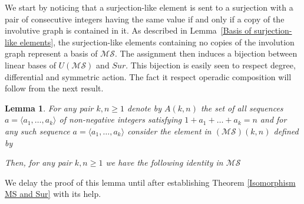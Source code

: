 \documentclass{amsart}
\newcommand{\MS}{\mathcal{MS}}
\newtheorem{lemma}[theorem]{Lemma}
\theoremstyle{definition}
\begin{document}
	We start by noticing that a surjection-like element is sent to a surjection with a pair of consecutive integers having the same value if and only if a copy of the involutive graph is contained in it. As described in \mbox{Lemma \ref{Basis of surjection-like elements}}, the surjection-like elements containing no copies of the involution graph represent a basis of $\MS$. The assignment then induces a bijection between linear bases of $U(\MS)$ and $Sur$. This bijection is easily seen to respect degree, differential and symmetric action. The fact it respect operadic composition will follow from the next result.
	\begin{lemma}\label{splitting lemma}
		For any pair $k,n\geq 1$ denote by $A(k,n)$ the set of all sequences $a=\langle a_1,\dots,a_k\rangle$ of non-negative integers satisfying $1+a_1+\dots+a_k=n$ and for any such sequence $a=\langle a_1,\dots,a_k\rangle$ consider the element in $(\MS)(k,n)$ defined by
		\begin{center}
		\end{center}
		Then, for any pair $k,n\geq1$ we have the following identity in $\MS$
		\begin{center}
		\end{center} 
	\end{lemma}
	We delay the proof of this lemma until after establishing Theorem \ref{Isomorphism MS and Sur} with its help.
	
\end{document}
